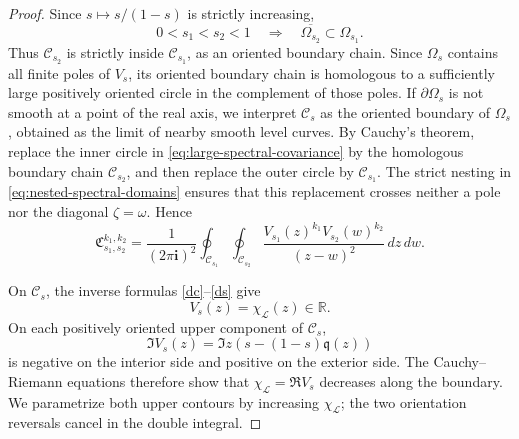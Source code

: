 \documentclass[11pt]{amsart}
\theoremstyle{plain}
\numberwithin{equation}{section}
\numberwithin{theorem}{section}
\numberwithin{figure}{section}
\begin{document}
\begin{proof}
Since \(s\mapsto s/(1-s)\) is strictly increasing,
\begin{equation}
    0<s_1<s_2<1
    \quad\Longrightarrow\quad
    \overline{\Omega_{s_2}}\subset\Omega_{s_1}.
    \label{eq:nested-spectral-domains}
\end{equation}
Thus \(\mathscr C_{s_2}\) is strictly inside
\(\mathscr C_{s_1}\), as an oriented boundary chain.
Since \(\Omega_s\) contains all finite poles of \(V_s\), its oriented
boundary chain is homologous to a sufficiently large positively
oriented circle in the complement of those poles.  If \(\partial\Omega_s\) is not smooth at a point of the real axis, we
interpret \(\mathscr C_s\) as the oriented boundary of \(\Omega_s\),
obtained as the limit of nearby smooth level curves.  By Cauchy's
theorem, replace the inner circle in
\eqref{eq:large-spectral-covariance} by the homologous boundary chain
\(\mathscr C_{s_2}\), and then replace the outer circle by
\(\mathscr C_{s_1}\).  The strict nesting in
\eqref{eq:nested-spectral-domains} ensures that this replacement
crosses neither a pole nor the diagonal \(\zeta=\omega\).  Hence
\begin{equation}
    \mathfrak C_{s_1,s_2}^{k_1,k_2}
    =
    \frac{1}{(2\pi\mathbf i)^2}
    \oint_{\mathscr C_{s_1}}
    \oint_{\mathscr C_{s_2}}
    \frac{V_{s_1}(z)^{k_1}V_{s_2}(w)^{k_2}}
         {(z-w)^2}
    \,dz\,dw.
    \label{eq:covariance-on-level-contours}
\end{equation}

On \(\mathscr C_s\), the inverse formulas
\eqref{dc}--\eqref{ds} give
\begin{equation}
    V_s(z)=\chi_{\mathcal L}(z)\in\mathbb R.
    \label{eq:V-on-level-curve}
\end{equation}
On each positively oriented upper component of \(\mathscr C_s\),
\[
    \Im V_s(z)
    =
    \Im z\left(s-(1-s)\mathfrak q(z)\right)
\]
is negative on the interior side and positive on the exterior side.
The Cauchy--Riemann equations therefore show that
\(\chi_{\mathcal L}=\Re V_s\) decreases along the boundary. We
parametrize both upper contours by increasing \(\chi_{\mathcal L}\);
the two orientation reversals cancel in the double integral.


\end{proof}
\end{document}
